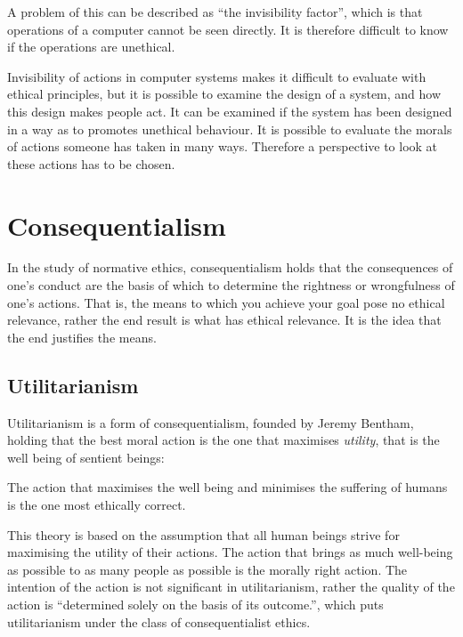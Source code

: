 A problem of this can be described as “the invisibility factor”, which is that operations of a computer cannot be seen directly. It is therefore difficult to know if the operations are unethical. \cite{moor1985computer}

Invisibility of actions in computer systems makes it difficult to evaluate with ethical principles, but it is possible to examine the design of a system, and how this design makes people act. It can be examined if the system has been designed in a way as to promotes unethical behaviour. It is possible to evaluate the morals of actions someone has taken in many ways. Therefore a perspective to look at these actions has to be chosen.

\section{Consequentialism}
In the study of normative ethics, consequentialism holds that the consequences of one's conduct are the basis of which to determine the rightness or wrongfulness of one's actions. That is, the means to which you achieve your goal pose no ethical relevance, rather the end result is what has ethical relevance. It is the idea that the end justifies the means. \cite{mizzoni2009ethics}

\subsection{Utilitarianism}
Utilitarianism is a form of consequentialism, founded by Jeremy Bentham, holding that the best moral action is the one that maximises \textit{utility}, that is the well being of sentient beings:

\begin{quote}
	 \cite{holm2013philosophy}
\end{quote}

\noindent The action that maximises the well being and minimises the suffering of humans is the one most ethically correct.

This theory is based on the assumption that all human beings strive for maximising the utility of their actions. The action that brings as much well-being as possible to as many people as possible is the morally right action. The intention of the action is not significant in utilitarianism, rather the quality of the action is “determined solely on the basis of its outcome.”, which puts utilitarianism under the class of consequentialist ethics. \cite{holm2013philosophy}

